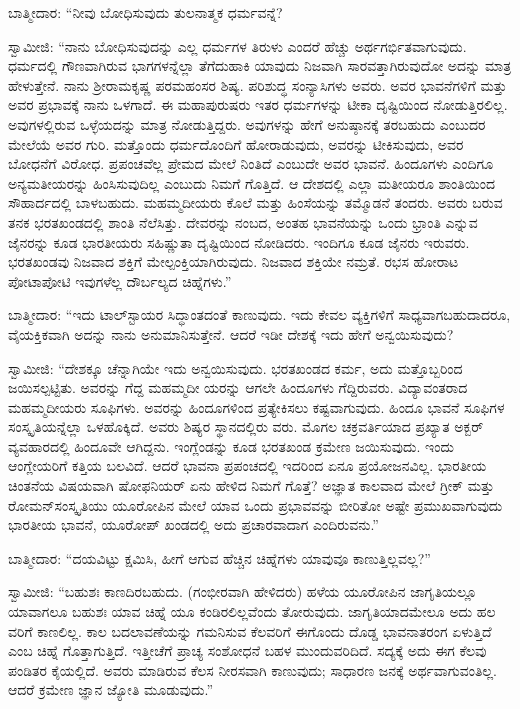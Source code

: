ಬಾತ್ಮೀದಾರ: “ನೀವು ಬೋಧಿಸುವುದು ತುಲನಾತ್ಮಕ ಧರ್ಮವನ್ನೆ?

ಸ್ವಾಮೀಜಿ: “ನಾನು ಬೋಧಿಸುವುದನ್ನು ಎಲ್ಲ ಧರ್ಮಗಳ ತಿರುಳು ಎಂದರೆ ಹೆಚ್ಚು ಅರ್ಥಗರ್ಭಿತವಾಗುವುದು. ಧರ್ಮದಲ್ಲಿ ಗೌಣವಾಗಿರುವ ಭಾಗಗಳನ್ನೆಲ್ಲಾ ತೆಗೆದುಹಾಕಿ ಯಾವುದು ನಿಜವಾಗಿ ಸಾರವತ್ತಾಗಿರುವುದೋ ಅದನ್ನು ಮಾತ್ರ ಹೇಳುತ್ತೇನೆ. ನಾನು ಶ‍್ರೀರಾಮಕೃಷ್ಣ ಪರಮಹಂಸರ ಶಿಷ್ಯ. ಪರಿಶುದ್ಧ ಸಂನ್ಯಾಸಿಗಳು ಅವರು. ಅವರ ಭಾವನೆಗಳಿಗೆ ಮತ್ತು ಅವರ ಪ್ರಭಾವಕ್ಕೆ ನಾನು ಒಳಗಾದೆ. ಈ ಮಹಾಪುರುಷರು ಇತರ ಧರ್ಮಗಳನ್ನು ಟೀಕಾ ದೃಷ್ಟಿಯಿಂದ ನೋಡುತ್ತಿರಲಿಲ್ಲ. ಅವುಗಳಲ್ಲಿರುವ ಒಳ್ಳೆಯದನ್ನು ಮಾತ್ರ ನೋಡುತ್ತಿದ್ದರು. ಅವುಗಳನ್ನು ಹೇಗೆ ಅನುಷ್ಠಾನಕ್ಕೆ ತರಬಹುದು ಎಂಬುದರ ಮೇಲೆಯೆ ಅವರ ಗುರಿ. ಮತ್ತೊಂದು ಧರ್ಮದೊಂದಿಗೆ ಹೋರಾಡುವುದು, ಅವರನ್ನು ಟೀಕಿಸುವುದು, ಅವರ ಬೋಧನೆಗೆ ವಿರೋಧ. ಪ್ರಪಂಚವೆಲ್ಲ ಪ್ರೇಮದ ಮೇಲೆ ನಿಂತಿದೆ ಎಂಬುದೇ ಅವರ ಭಾವನೆ. ಹಿಂದೂಗಳು ಎಂದಿಗೂ ಅನ್ಯಮತೀಯರನ್ನು ಹಿಂಸಿಸುವುದಿಲ್ಲ ಎಂಬುದು ನಿಮಗೆ ಗೊತ್ತಿದೆ. ಆ ದೇಶದಲ್ಲಿ ಎಲ್ಲಾ ಮತೀಯರೂ ಶಾಂತಿಯಿಂದ ಸೌಹಾರ್ದದಲ್ಲಿ ಬಾಳಬಹುದು. ಮಹಮ್ಮದೀಯರು ಕೊಲೆ ಮತ್ತು ಹಿಂಸೆಯನ್ನು ತಮ್ಮೊಡನೆ ತಂದರು. ಅವರು ಬರುವ ತನಕ ಭರತಖಂಡದಲ್ಲಿ ಶಾಂತಿ ನೆಲೆಸಿತ್ತು. ದೇವರನ್ನು ನಂಬದ, ಅಂತಹ ಭಾವನೆಯನ್ನು ಒಂದು ಭ್ರಾಂತಿ ಎನ್ನುವ ಜೈನರನ್ನು ಕೂಡ ಭಾರತೀಯರು ಸಹಿಷ್ಣುತಾ ದೃಷ್ಟಿಯಿಂದ ನೋಡಿದರು. ಇಂದಿಗೂ ಕೂಡ ಜೈನರು ಇರುವರು. ಭರತಖಂಡವು ನಿಜವಾದ ಶಕ್ತಿಗೆ ಮೇಲ್ಪಂಕ್ತಿಯಾಗಿರುವುದು. ನಿಜವಾದ ಶಕ್ತಿಯೇ ನಮ್ರತೆ. ರಭಸ ಹೋರಾಟ ಪೋಟಾಪೋಟಿ ಇವುಗಳೆಲ್ಲ ದೌರ್ಬಲ್ಯದ ಚಿಹ್ನೆಗಳು.”

ಬಾತ್ಮೀದಾರ: “ಇದು ಟಾಲ್​ಸ್ಟಾಯರ ಸಿದ್ಧಾಂತದಂತೆ ಕಾಣುವುದು. ಇದು ಕೇವಲ ವ್ಯಕ್ತಿಗಳಿಗೆ ಸಾಧ್ಯವಾಗಬಹುದಾದರೂ, ವೈಯಕ್ತಿಕವಾಗಿ ಅದನ್ನು ನಾನು ಅನುಮಾನಿಸುತ್ತೇನೆ. ಆದರೆ ಇಡೀ ದೇಶಕ್ಕೆ ಇದು ಹೇಗೆ ಅನ್ವಯಿಸುವುದು?

ಸ್ವಾಮೀಜಿ: “ದೇಶಕ್ಕೂ ಚೆನ್ನಾಗಿಯೇ ಇದು ಅನ್ವಯಿಸುವುದು. ಭರತಖಂಡದ ಕರ್ಮ, ಅದು ಮತ್ತೊಬ್ಬರಿಂದ ಜಯಿಸಲ್ಪಟ್ಟಿತು. ಅವರನ್ನು ಗೆದ್ದ ಮಹಮ್ಮದೀ ಯರನ್ನು ಆಗಲೇ ಹಿಂದೂಗಳು ಗೆದ್ದಿರುವರು. ವಿದ್ಯಾವಂತರಾದ ಮಹಮ್ಮದೀಯರು ಸೂಫಿಗಳು. ಅವರನ್ನು ಹಿಂದೂಗಳಿಂದ ಪ್ರತ್ಯೇಕಿಸಲು ಕಷ್ಟವಾಗುವುದು. ಹಿಂದೂ ಭಾವನೆ ಸೂಫಿಗಳ ಸಂಸ್ಕೃತಿಯನ್ನೆಲ್ಲಾ ಒಳಹೊಕ್ಕಿದೆ. ಅವರು ಶಿಷ್ಯರ ಸ್ಥಾನದಲ್ಲಿರು ವರು. ಮೊಗಲ ಚಕ್ರವರ್ತಿಯಾದ ಪ್ರಖ್ಯಾತ ಅಕ್ಬರ್​ ವ್ಯವಹಾರದಲ್ಲಿ ಹಿಂದೂವೇ ಆಗಿದ್ದನು. ಇಂಗ್ಲೆಂಡನ್ನು ಕೂಡ ಭರತಖಂಡ ಕ್ರಮೇಣ ಜಯಿಸುವುದು. ಇಂದು ಆಂಗ್ಲೇಯರಿಗೆ ಕತ್ತಿಯ ಬಲವಿದೆ. ಆದರೆ ಭಾವನಾ ಪ್ರಪಂಚದಲ್ಲಿ ಇದರಿಂದ ಏನೂ ಪ್ರಯೋಜನವಿಲ್ಲ. ಭಾರತೀಯ ಚಿಂತನೆಯ ವಿಷಯವಾಗಿ ಷೋಫನಿಯರ್​ ಏನು ಹೇಳಿದ ನಿಮಗೆ ಗೊತ್ತೆ? ಅಜ್ಞಾತ ಕಾಲವಾದ ಮೇಲೆ ಗ್ರೀಕ್​ ಮತ್ತು ರೋಮನ್​ ಸಂಸ್ಕೃತಿಯು ಯೂರೋಪಿನ ಮೇಲೆ ಯಾವ ಒಂದು ಪ್ರಭಾವವನ್ನು ಬೀರಿತೋ ಅಷ್ಟೇ ಪ್ರಮುಖವಾಗುವುದು ಭಾರತೀಯ ಭಾವನೆ, ಯೂರೋಪ್​ ಖಂಡದಲ್ಲಿ ಅದು ಪ್ರಚಾರವಾದಾಗ ಎಂದಿರುವನು.”

ಬಾತ್ಮೀದಾರ: “ದಯವಿಟ್ಟು ಕ್ಷಮಿಸಿ, ಹೀಗೆ ಆಗುವ ಹೆಚ್ಚಿನ ಚಿಹ್ನೆಗಳು ಯಾವುವೂ ಕಾಣುತ್ತಿಲ್ಲವಲ್ಲ?”

ಸ್ವಾಮೀಜಿ: “ಬಹುಶಃ ಕಾಣದಿರಬಹುದು. (ಗಂಭೀರವಾಗಿ ಹೇಳಿದರು) ಹಳೆಯ ಯೂರೋಪಿನ ಜಾಗೃತಿಯಲ್ಲೂ ಯಾವಾಗಲೂ ಬಹುಶಃ ಯಾವ ಚಿಹ್ನೆ ಯೂ ಕಂಡಿರಲಿಲ್ಲವೆಂದು ತೋರುವುದು. ಜಾಗೃತಿಯಾದಮೇಲೂ ಅದು ಹಲ ವರಿಗೆ ಕಾಣಲಿಲ್ಲ. ಕಾಲ ಬದಲಾವಣೆಯನ್ನು ಗಮನಿಸುವ ಕೆಲವರಿಗೆ ಈಗೊಂದು ದೊಡ್ಡ ಭಾವನಾತರಂಗ ಏಳುತ್ತಿದೆ ಎಂಬ ಚಿಹ್ನೆ ಗೊತ್ತಾಗುತ್ತಿದೆ. ಇತ್ತೀಚೆಗೆ ಪ್ರಾಚ್ಯ ಸಂಶೋಧನೆ ಬಹಳ ಮುಂದುವರಿದಿದೆ. ಸದ್ಯಕ್ಕೆ ಅದು ಈಗ ಕೆಲವು ಪಂಡಿತರ ಕೈಯಲ್ಲಿದೆ. ಅವರು ಮಾಡಿರುವ ಕೆಲಸ ನೀರಸವಾಗಿ ಕಾಣುವುದು; ಸಾಧಾರಣ ಜನಕ್ಕೆ ಅರ್ಥವಾಗುವಂತಿಲ್ಲ. ಆದರೆ ಕ್ರಮೇಣ ಜ್ಞಾನ ಜ್ಯೋತಿ ಮೂಡುವುದು.”

